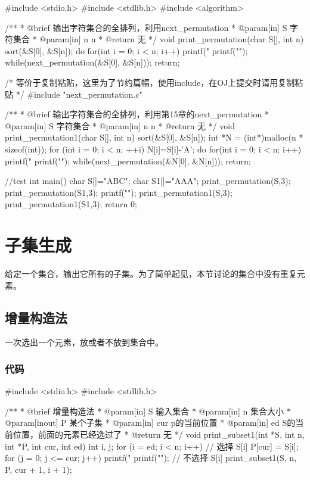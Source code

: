 \begin{Codex}[label=print_permutation_next.c]
#include <stdio.h>
#include <stdlib.h>
#include <algorithm>

/**
 * @brief 输出字符集合的全排列，利用next_permutation
 * @param[in] S 字符集合
 * @param[in] n n
 * @return 无
 */
void print_permutation(char S[], int n) {
    sort(&S[0], &S[n]);
    do {
        for(int i = 0; i < n; i++) printf("%
        printf("\n");
    }while(next_permutation(&S[0], &S[n]));
    return;
}

/* 等价于复制粘贴，这里为了节约篇幅，使用include，在OJ上提交时请用复制粘贴 */
#include "next_permutation.c"

/**
 * @brief 输出字符集合的全排列，利用第15章的next_permutation
 * @param[in] S 字符集合
 * @param[in] n n
 * @return 无
 */
void print_permutation1(char S[], int n) {
    sort(&S[0], &S[n]);
    int *N = (int*)malloc(n * sizeof(int));
    for (int i = 0; i < n; ++i) N[i]=S[i]-'A';
    do {
        for(int i = 0; i < n; i++) printf("%
        printf("\n");
    }while(next_permutation(&N[0], &N[n]));
    return;
}

//test
int main() {
    char S[]="ABC";
    char S1[]="AAA";
    print_permutation(S,3);
    print_permutation(S1,3);
    printf("\n\n");
    print_permutation1(S,3);
    print_permutation1(S1,3);
    return 0;
}
\end{Codex}


\section{子集生成} %
给定一个集合，输出它所有的子集。为了简单起见，本节讨论的集合中没有重复元素。


\subsection{增量构造法}
一次选出一个元素，放或者不放到集合中。

\subsubsection{代码}

\begin{Codex}[label=subset.c]
#include <stdio.h>
#include <stdlib.h>

/**
 * @brief 增量构造法
 * @param[in] S 输入集合
 * @param[in] n 集合大小
 * @param[inout] P 某个子集
 * @param[in] cur p的当前位置
 * @param[in] ed S的当前位置，前面的元素已经选过了
 * @return 无
 */
void print_subset1(int *S, int n, int *P, int cur, int ed) {
    int i, j;
    for (i = ed; i < n; i++) {
        // 选择 S[i]
        P[cur] = S[i];
        for (j = 0; j <= cur; j++) printf("%
        printf("\n");
        // 不选择 S[i]
        print_subset1(S, n, P, cur + 1, i + 1);
    }
}
\end{Codex}


